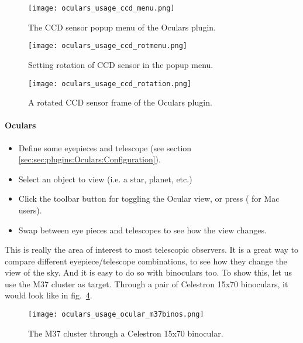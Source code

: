 \begin{figure}[p]\centering
\texttt{[image: oculars\_usage\_ccd\_menu.png]}
\caption{The CCD sensor popup menu of the Oculars plugin.}
\label{fig:plugins:Oculars:Usage:CCD:Menu}
\end{figure}

\begin{figure}[p]\centering
\texttt{[image: oculars\_usage\_ccd\_rotmenu.png]}
\caption{Setting rotation of CCD sensor in the popup menu.}
\label{fig:plugins:Oculars:Usage:CCD:RotMenu}
\end{figure}

\begin{figure}[p]\centering
\texttt{[image: oculars\_usage\_ccd\_rotation.png]}
\caption{A rotated CCD sensor frame of the Oculars plugin.}
\label{fig:plugins:Oculars:Usage:CCD:Rotation}
\end{figure}

\newpage


\paragraph{Oculars}

\begin{itemize}
\item Define some eyepieces and telescope (see section \ref{sec:sec:plugins:Oculars:Configuration}).
\item Select an object to view (i.e. a star, planet, etc.)
\item Click the toolbar button  for toggling the Ocular view, 
      or press  ( for Mac users).
\item Swap between eye pieces and telescopes to see how the view changes.
\end{itemize}

This is really the area of interest to most telescopic observers. 
It is a great way to compare different eyepiece/telescope combinations, to see how they change the view of the sky. 
And it is easy to do so with binoculars too. 
To show this, let us use the M37 cluster as target. Through a pair of Celestron 15x70 binoculars, it would look like in fig.~\ref{fig:plugins:Oculars:Usage:Ocular:M37Binos}.

\begin{figure}[h]\centering
\texttt{[image: oculars\_usage\_ocular\_m37binos.png]}
\caption{The M37 cluster through a Celestron 15x70 binocular.}
\label{fig:plugins:Oculars:Usage:Ocular:M37Binos}
\end{figure}

